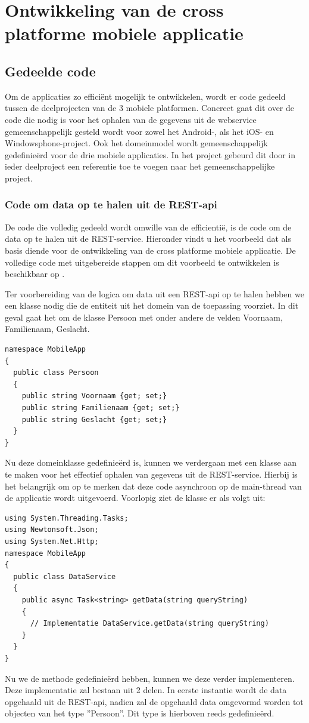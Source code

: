 \section{Ontwikkeling van de cross platforme mobiele applicatie}
\subsection{Gedeelde code}
Om de applicaties zo efficiënt mogelijk te ontwikkelen, wordt er code gedeeld tussen de deelprojecten van de 3 mobiele
platformen. Concreet gaat dit over de code die nodig is voor het ophalen van de gegevens uit de webservice gemeenschappelijk
gesteld wordt voor zowel het Android-, als het iOS- en Windowsphone-project. Ook het domeinmodel wordt gemeenschappelijk
gedefinieërd voor de drie mobiele applicaties. In het project gebeurd dit door in ieder deelproject een referentie toe te voegen
naar het gemeenschappelijke project.

\subsubsection{Code om data op te halen uit de REST-api}
De code die volledig gedeeld wordt omwille van de efficientië, is de code om de data op te halen uit de REST-service.
Hieronder vindt u het voorbeeld dat als basis diende voor de ontwikkeling van de cross platforme mobiele applicatie.
De volledige code met uitgebereide stappen om dit voorbeeld te ontwikkelen is beschikbaar op \citet{buildappwithnativeuiusingxamarininvisualstudio2017}.

Ter voorbereiding van de logica om data uit een REST-api op te halen hebben we een klasse nodig die de entiteit uit het
domein van de toepassing voorziet. In dit geval gaat het om de klasse Persoon met onder andere de velden Voornaam, Familienaam, Geslacht.
\newpage
\begin{lstlisting}
namespace MobileApp
{
  public class Persoon
  {
    public string Voornaam {get; set;}
    public string Familienaam {get; set;}
    public string Geslacht {get; set;}
  }
}
\end{lstlisting}
Nu deze domeinklasse gedefinieërd is, kunnen we verdergaan met een klasse aan te maken voor het effectief ophalen van
gegevens uit de REST-service. Hierbij is het belangrijk om op te merken dat deze code asynchroon op de main-thread van de
applicatie wordt uitgevoerd. Voorlopig ziet de klasse er als volgt uit:
\begin{lstlisting}
using System.Threading.Tasks;
using Newtonsoft.Json;
using System.Net.Http;
namespace MobileApp
{
  public class DataService
  {
    public async Task<string> getData(string queryString)
    {
      // Implementatie DataService.getData(string queryString)
    }
  }
}
\end{lstlisting}
Nu we de methode gedefinieërd hebben, kunnen we deze verder implementeren.
Deze implementatie zal bestaan uit 2 delen. In eerste instantie wordt de data opgehaald uit de REST-api, nadien zal de opgehaald data
omgevormd worden tot objecten van het type ''Persoon''. Dit type is hierboven reeds gedefinieërd.

